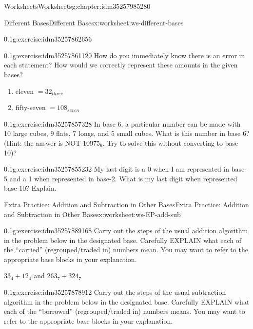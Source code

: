 \documentclass[twoside,11pt,]{book}
\begin{document}
\begin{chapterptx}{Worksheets}{}{Worksheets}{}{}{g:chapter:idm35257985280}
\begin{worksheet-section-numberless}{Different Bases}{}{Different Bases}{}{}{x:worksheet:ws-different-bases}
\begin{divisionexercise}{4}{}{0.1}{g:exercise:idm35257862656}
\end{divisionexercise}%
\begin{divisionexercise}{5}{}{0.1}{g:exercise:idm35257861120}%
How do you immediately know there is an error in each statement?  How would we correctly represent these amounts in the given bases?%
%
\begin{enumerate}[label=(\alph*)]
\item{}eleven \(= 32_{three}\)%
\item{}fifty-seven \(= 108_{seven}\)%
\end{enumerate}
\end{divisionexercise}%
\begin{divisionexercise}{6}{}{0.1}{g:exercise:idm35257857328}%
In base 6, a particular number can be made with 10 large cubes, 9 flats, 7 longs, and 5 small cubes.  What is this number in base 6? (Hint: the answer is NOT \(10975_6 \). Try to solve this without converting to base 10)?%
\end{divisionexercise}%
\begin{divisionexercise}{7}{}{0.1}{g:exercise:idm35257855232}%
My last digit is a 0 when I am represented in base-5 and a 1 when represented in base-2.  What is my last digit when represented base-10? Explain.%
\end{divisionexercise}%
\end{worksheet-section-numberless}
\restoregeometry
%
%
\typeout{************************************************}
\typeout{************************************************}
%
\begin{worksheet-section-numberless}{Extra Practice: Addition and Subtraction in Other Bases}{}{Extra Practice: Addition and Subtraction in Other Bases}{}{}{x:worksheet:ws-EP-add-sub}
\begin{divisionexercise}{1}{}{0.1}{g:exercise:idm35257889168}%
Carry out the steps of the usual addition algorithm in the problem below in the designated base.  Carefully EXPLAIN what each of the “carried” (regrouped\slash{}traded in) numbers mean.  You may want to refer to the appropriate base blocks in your explanation.%
\par
\(33_4+12_4\) and \(263_7+324_7\)%
\end{divisionexercise}%
\begin{divisionexercise}{2}{}{0.1}{g:exercise:idm35257878912}%
Carry out the steps of the usual subtraction algorithm in the problem below in the designated base.  Carefully EXPLAIN what each of the “borrowed” (regrouped\slash{}traded in) numbers means.  You may want to refer to the appropriate base blocks in your explanation.%

\end{divisionexercise}
\end{worksheet-section-numberless}
\end{chapterptx}
\end{document}
